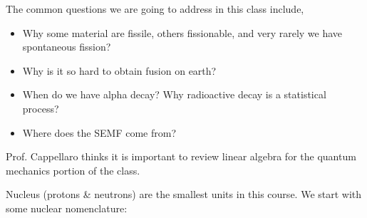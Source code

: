 \documentclass{school-22.101-notes}
\begin{document}
The common questions we are going to address in this class include,
\begin{itemize}
\item Why some material are fissile, others fissionable, and very rarely we have spontaneous fission?
\item Why is it so hard to obtain fusion on earth?
\item When do we have alpha decay? Why radioactive decay is a statistical process?
\item Where does the SEMF come from?
\end{itemize}

Prof. Cappellaro thinks it is important to review linear algebra for the quantum mechanics portion of the class. 


Nucleus (protons \& neutrons) are the smallest units in this course. We start with some nuclear nomenclature:
\end{document}
